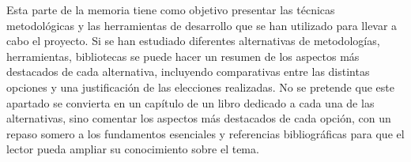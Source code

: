 
Esta parte de la memoria tiene como objetivo presentar las técnicas metodológicas y las herramientas de desarrollo que se han utilizado para llevar a cabo el proyecto. Si se han estudiado diferentes alternativas de metodologías, herramientas, bibliotecas se puede hacer un resumen de los aspectos más destacados de cada alternativa, incluyendo comparativas entre las distintas opciones y una justificación de las elecciones realizadas. 
No se pretende que este apartado se convierta en un capítulo de un libro dedicado a cada una de las alternativas, sino comentar los aspectos más destacados de cada opción, con un repaso somero a los fundamentos esenciales y referencias bibliográficas para que el lector pueda ampliar su conocimiento sobre el tema.


